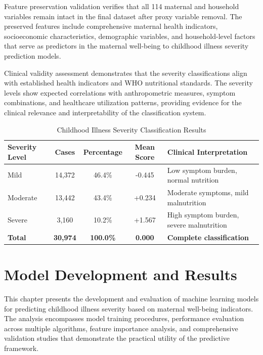 \documentclass[12pt]{report}
\begin{document}
Feature preservation validation verifies that all 114 maternal and household variables remain intact in the final dataset after proxy variable removal. The preserved features include comprehensive maternal health indicators, socioeconomic characteristics, demographic variables, and household-level factors that serve as predictors in the maternal well-being to childhood illness severity prediction models.

Clinical validity assessment demonstrates that the severity classifications align with established health indicators and WHO nutritional standards. The severity levels show expected correlations with anthropometric measures, symptom combinations, and healthcare utilization patterns, providing evidence for the clinical relevance and interpretability of the classification system.

\begin{table}[H]
\centering
\caption{Childhood Illness Severity Classification Results}
\label{tab:severity_classification}
\begin{tabular}{|l|c|c|c|p{4.5cm}|}
\hline
\textbf{Severity Level} & \textbf{Cases} & \textbf{Percentage} & \textbf{Mean Score} & \textbf{Clinical Interpretation} \\
\hline
Mild & 14,372 & 46.4\% & -0.445 & Low symptom burden, normal nutrition \\
\hline
Moderate & 13,442 & 43.4\% & +0.234 & Moderate symptoms, mild malnutrition \\
\hline
Severe & 3,160 & 10.2\% & +1.567 & High symptom burden, severe malnutrition \\
\hline
\textbf{Total} & \textbf{30,974} & \textbf{100.0\%} & \textbf{0.000} & \textbf{Complete classification} \\
\hline
\end{tabular}
\end{table}


\chapter{Model Development and Results}

This chapter presents the development and evaluation of machine learning models for predicting childhood illness severity based on maternal well-being indicators. The analysis encompasses model training procedures, performance evaluation across multiple algorithms, feature importance analysis, and comprehensive validation studies that demonstrate the practical utility of the predictive framework.
\end{document}
